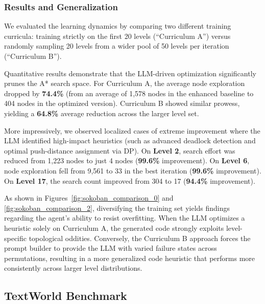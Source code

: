 \documentclass{article}
\begin{document}
\subsubsection{Results and Generalization}
We evaluated the learning dynamics by comparing two different training curricula: training strictly on the first 20 levels (``Curriculum A'') versus randomly sampling 20 levels from a wider pool of 50 levels per iteration (``Curriculum B''). 

Quantitative results demonstrate that the LLM-driven optimization significantly prunes the A* search space. For Curriculum A, the average node exploration dropped by \textbf{74.4\%} (from an average of 1,578 nodes in the enhanced baseline to 404 nodes in the optimized version). Curriculum B showed similar prowess, yielding a \textbf{64.8\%} average reduction across the larger level set.

More impressively, we observed localized cases of extreme improvement where the LLM identified high-impact heuristics (such as advanced deadlock detection and optimal push-distance assignment via DP). On \textbf{Level 2}, search effort was reduced from 1,223 nodes to just 4 nodes (\textbf{99.6\%} improvement). On \textbf{Level 6}, node exploration fell from 9,561 to 33 in the best iteration (\textbf{99.6\%} improvement). On \textbf{Level 17}, the search count improved from 304 to 17 (\textbf{94.4\%} improvement).

As shown in Figures~\ref{fig:sokoban_comparison_0} and \ref{fig:sokoban_comparison_2}, diversifying the training set yields findings regarding the agent's ability to resist overfitting. When the LLM optimizes a heuristic solely on Curriculum A, the generated code strongly exploits level-specific topological oddities. Conversely, the Curriculum B approach forces the prompt builder to provide the LLM with varied failure states across permutations, resulting in a more generalized code heuristic that performs more consistently across larger level distributions.

\subsection{TextWorld Benchmark}

\end{document}
